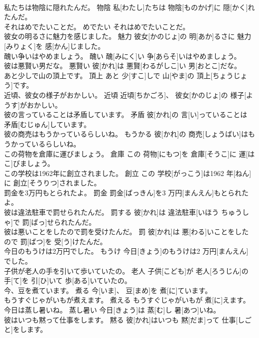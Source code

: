 \documentclass[8pt]{extreport}
\begin{document}
\begin{CJK}{UTF8}{min}
\\	私たちは物陰に隠れたんだ。	物陰	私[わたし]たちは 物陰[ものかげ]に 隠[かく]れたんだ。	
\\	それはめでたいことだ。	めでたい	それはめでたいことだ。	
\\	彼女の明るさに魅力を感じました。	魅力	彼女[かのじょ]の 明[あか]るさに 魅力[みりょく]を 感[かん]じました。	
\\	醜い争いはやめましょう。	醜い	醜[みにく]い 争[あらそ]いはやめましょう。	
\\	彼は悪賢い男だな。	悪賢い	彼[かれ]は 悪賢[わるがしこ]い 男[おとこ]だな。	
\\	あと少しで山の頂上です。	頂上	あと 少[すこ]しで 山[やま]の 頂上[ちょうじょう]です。	
\\	近頃、彼女の様子がおかしい。	近頃	近頃[ちかごろ]、 彼女[かのじょ]の 様子[ようす]がおかしい。	
\\	彼の言っていることは矛盾しています。	矛盾	彼[かれ]の 言[い]っていることは 矛盾[むじゅん]しています。	
\\	彼の商売はもうかっているらしいね。	もうかる	彼[かれ]の 商売[しょうばい]はもうかっているらしいね。	
\\	この荷物を倉庫に運びましょう。	倉庫	この 荷物[にもつ]を 倉庫[そうこ]に 運[はこ]びましょう。	
\\	この学校は1962年に創立されました。	創立	この 学校[がっこう]は1962 年[ねん]に 創立[そうりつ]されました。	
\\	罰金を3万円もとられたよ。	罰金	罰金[ばっきん]を3 万円[まんえん]もとられたよ。	
\\	彼は違法駐車で罰せられたんだ。	罰する	彼[かれ]は 違法駐車[いほう ちゅうしゃ]で 罰[ばっ]せられたんだ。	
\\	彼は悪いことをしたので罰を受けたんだ。	罰	彼[かれ]は 悪[わる]いことをしたので 罰[ばつ]を 受[う]けたんだ。	
\\	今日のもうけは2万円でした。	もうけ	今日[きょう]のもうけは2 万円[まんえん]でした。	
\\	子供が老人の手を引いて歩いていたの。	老人	子供[こども]が 老人[ろうじん]の 手[て]を 引[ひ]いて 歩[ある]いていたの。	
\\	今、豆を煮ています。	煮る	今[いま]、 豆[まめ]を 煮[に]ています。	
\\	もうすぐじゃがいもが煮えます。	煮える	もうすぐじゃがいもが 煮[に]えます。	
\\	今日は蒸し暑いね。	蒸し暑い	今日[きょう]は 蒸[む]し 暑[あつ]いね。	
\\	彼はいつも黙って仕事をします。	黙る	彼[かれ]はいつも 黙[だま]って 仕事[しごと]をします。	

\end{CJK}
\end{document}
